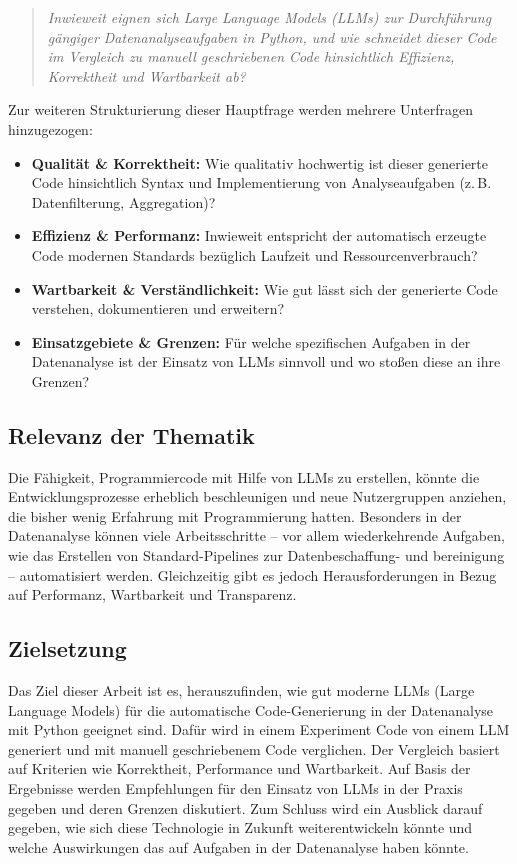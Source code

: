 \documentclass[11pt,a4paper]{article}
\begin{document}
\begin{quote}
    \emph{Inwieweit eignen sich Large Language Models (LLMs) zur Durchführung gängiger Datenanalyseaufgaben in Python, und wie schneidet dieser Code im Vergleich zu manuell geschriebenen Code hinsichtlich Effizienz, Korrektheit und Wartbarkeit ab?}
\end{quote}

Zur weiteren Strukturierung dieser Hauptfrage werden mehrere Unterfragen hinzugezogen:
\begin{itemize}
    \item \textbf{Qualität \& Korrektheit:} Wie qualitativ hochwertig ist dieser generierte Code hinsichtlich Syntax und Implementierung von Analyseaufgaben (z.\,B. Datenfilterung, Aggregation)?
    \item \textbf{Effizienz \& Performanz:} Inwieweit entspricht der automatisch erzeugte Code modernen Standards bezüglich Laufzeit und Ressourcenverbrauch?
    \item \textbf{Wartbarkeit \& Verständlichkeit:} Wie gut lässt sich der generierte Code verstehen, dokumentieren und erweitern?
    \item \textbf{Einsatzgebiete \& Grenzen:} Für welche spezifischen Aufgaben in der Datenanalyse ist der Einsatz von LLMs sinnvoll und wo stoßen diese an ihre Grenzen?
\end{itemize}

\subsection{Relevanz der Thematik}
Die Fähigkeit, Programmiercode mit Hilfe von LLMs zu erstellen, könnte die Entwicklungsprozesse erheblich beschleunigen und neue Nutzergruppen anziehen, die bisher wenig Erfahrung mit Programmierung hatten. Besonders in der Datenanalyse können viele Arbeitsschritte – vor allem wiederkehrende Aufgaben, wie das Erstellen von Standard-Pipelines zur Datenbeschaffung- und bereinigung – automatisiert werden. Gleichzeitig gibt es jedoch Herausforderungen in Bezug auf Performanz, Wartbarkeit und Transparenz.

\subsection{Zielsetzung}
Das Ziel dieser Arbeit ist es, herauszufinden, wie gut moderne LLMs (Large Language Models) für die automatische Code-Generierung in der Datenanalyse mit Python geeignet sind. Dafür wird in einem Experiment Code von einem LLM generiert und mit manuell geschriebenem Code verglichen. Der Vergleich basiert auf Kriterien wie Korrektheit, Performance und Wartbarkeit. Auf Basis der Ergebnisse werden Empfehlungen für den Einsatz von LLMs in der Praxis gegeben und deren Grenzen diskutiert. Zum Schluss wird ein Ausblick darauf gegeben, wie sich diese Technologie in Zukunft weiterentwickeln könnte und welche Auswirkungen das auf Aufgaben in der Datenanalyse haben könnte.
\end{document}
